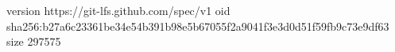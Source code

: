 version https://git-lfs.github.com/spec/v1
oid sha256:b27a6c23361be34e54b391b98e5b67055f2a9041f3e3d0d51f59fb9c73e9df63
size 297575
